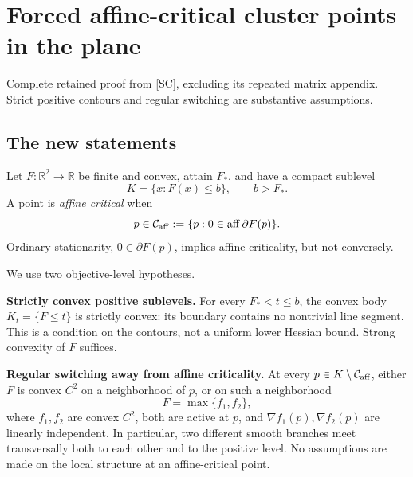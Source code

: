 \documentclass[10pt,oneside,openany]{book}
\newcommand{\ModuleTag}{I}
\theoremstyle{remark}\newtheorem{remark}{Remark}[chapter]
\renewcommand{\thetheorem}{\ModuleTag.\arabic{theorem}}
\renewcommand{\thelemma}{\ModuleTag.\arabic{lemma}}
\renewcommand{\thecorollary}{\ModuleTag.\arabic{corollary}}
\renewcommand{\theproposition}{\ModuleTag.\arabic{proposition}}
\renewcommand{\theremark}{\ModuleTag.\arabic{remark}}
\newcommand{\StartModule}[3]{\cleardoublepage\renewcommand{\ModuleTag}{#1}\chapter{#2}\label{#1:chapter}\begin{small}\color{Accent}#3\end{small}\par\vspace{3pt}{\color{RuleGray}\hrule}\vspace{9pt}}
\begin{document}

\StartModule{C}{Forced affine-critical cluster points in the plane}{Complete retained proof from [SC], excluding its repeated matrix appendix. Strict positive contours and regular switching are substantive assumptions.}

\begingroup
\providecommand{\R}{}
\renewcommand{\R}{\mathbb R}
\providecommand{\aff}{}
\renewcommand{\aff}{\operatorname{aff}}
\providecommand{\conv}{}
\renewcommand{\conv}{\operatorname{conv}}
\providecommand{\tr}{}
\renewcommand{\tr}{\operatorname{tr}}
\providecommand{\dist}{}
\renewcommand{\dist}{\operatorname{dist}}
\providecommand{\Ca}{}
\renewcommand{\Ca}{\mathcal C_{\rm aff}}
\providecommand{\ip}{}
\renewcommand{\ip}[2]{\langle #1,#2\rangle}
\providecommand{\norm}{}
\renewcommand{\norm}[1]{\lVert #1\rVert}
\makeatletter\let\c@lemma\c@theorem\let\c@corollary\c@theorem\let\c@proposition\c@theorem\let\c@remark\c@theorem\makeatother
\renewcommand{\thelemma}{\thetheorem}\renewcommand{\thecorollary}{\thetheorem}\renewcommand{\theproposition}{\thetheorem}\renewcommand{\theremark}{\thetheorem}
\setcounter{section}{0}
\setcounter{theorem}{0}
\setcounter{equation}{0}
\section{The new statements}
Let $F:\R^2\to\R$ be finite and convex, attain $F_*$, and have a compact sublevel
\[
K=\{x:F(x)\le b\},\qquad b>F_*.
\]
A point is \emph{affine critical} when
\[
 p\in\Ca:=\{p:0\in\aff\partial F(p)\}.
\]
Ordinary stationarity, $0\in\partial F(p)$, implies affine criticality, but not conversely.

We use two objective-level hypotheses.

\textbf{Strictly convex positive sublevels.} For every $F_*<t\le b$, the convex body $K_t=\{F\le t\}$ is strictly convex: its boundary contains no nontrivial line segment. This is a condition on the contours, not a uniform lower Hessian bound. Strong convexity of $F$ suffices.

\textbf{Regular switching away from affine criticality.} At every $p\in K\setminus\Ca$, either $F$ is convex $C^2$ on a neighborhood of $p$, or on such a neighborhood
\[
 F=\max\{f_1,f_2\},
\]
where $f_1,f_2$ are convex $C^2$, both are active at $p$, and $\nabla f_1(p),\nabla f_2(p)$ are linearly independent. In particular, two different smooth branches meet transversally both to each other and to the positive level. No assumptions are made on the local structure at an affine-critical point.
\end{document}
